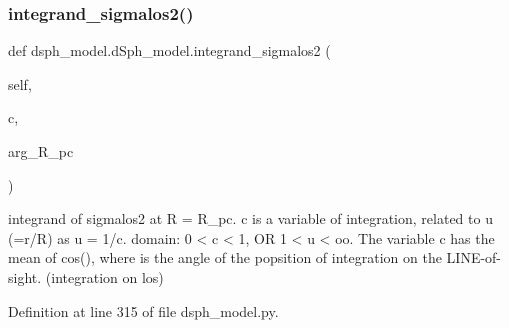 \subsubsection{\texorpdfstring{integrand\+\_\+sigmalos2()}{integrand\_sigmalos2()}}
{\footnotesize\ttfamily def dsph\+\_\+model.\+d\+Sph\+\_\+model.\+integrand\+\_\+sigmalos2 (\begin{DoxyParamCaption}\item[{}]{self,  }\item[{}]{c,  }\item[{}]{arg\+\_\+\+R\+\_\+pc }\end{DoxyParamCaption})}

\begin{DoxyVerb}integrand of sigmalos2 at R = R_pc.
c is a variable of integration, related to u (=r/R) as u = 1/c.
domain: 0 < c < 1, OR 1 < u < oo.
The variable c has the mean of cos(\theta), where \theta is the angle of the popsition of integration
on the LINE-of-sight. (integration on los)
\end{DoxyVerb}
 

Definition at line 315 of file dsph\+\_\+model.\+py.


